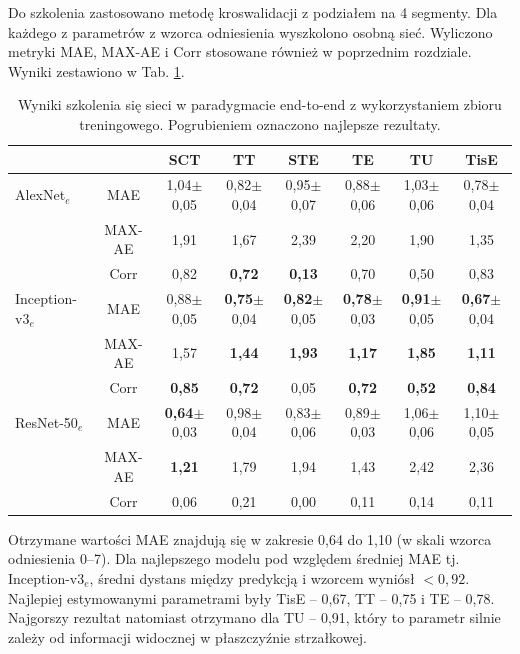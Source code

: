 Do szkolenia zastosowano metodę kroswalidacji z podziałem na 4 segmenty. Dla każdego z parametrów z wzorca odniesienia wyszkolono osobną sieć. Wyliczono metryki MAE, MAX-AE i Corr stosowane również w poprzednim rozdziale. Wyniki zestawiono w Tab. \ref{tab:end-to-endTrain}.
\renewcommand{\arraystretch}{1.2}
\begin{table}[ht]
\scriptsize
\setlength{\tabcolsep}{1pt}
\centering
\caption{Wyniki szkolenia się sieci w paradygmacie end-to-end z wykorzystaniem zbioru treningowego. Pogrubieniem oznaczono najlepsze rezultaty.}
\label{tab:end-to-endTrain}
\begin{tabular}{lc||c|c|c|c|c|c}
	&& \textbf{SCT} & \textbf{TT} & \textbf{STE} & \textbf{TE} & \textbf{TU} & \textbf{TisE}\\ \hline \hline
	AlexNet$_{e}$ & MAE & 1,04$\pm$0,05 & 0,82$\pm$0,04 & 0,95$\pm$0,07 & 0,88$\pm$0,06 & 1,03$\pm$0,06 & 0,78$\pm$0,04  \\
	&MAX-AE & 1,91 & 1,67 & 2,39 & 2,20 & 1,90 & 1,35\\ 
	&Corr & 0,82 & \textbf{0,72} & \textbf{0,13} & 0,70 & 0,50 & 0,83 \\ \hline
	Inception-v3$_{e}$ & MAE & 0,88$\pm$0,05 & \textbf{0,75}$\pm$0,04 & \textbf{0,82}$\pm$0,05 & \textbf{0,78}$\pm$0,03 & \textbf{0,91}$\pm$0,05 & \textbf{0,67}$\pm$0,04 \\
	&MAX-AE & 1,57 & \textbf{1,44} & \textbf{1,93} & \textbf{1,17} & \textbf{1,85} & \textbf{1,11} \\ 
	&Corr & \textbf{0,85} & \textbf{0,72} & 0,05 & \textbf{0,72} & \textbf{0,52} & \textbf{0,84} \\ \hline
	ResNet-50$_{e}$ & MAE & \textbf{0,64}$\pm$0,03 & 0,98$\pm$0,04 & 0,83$\pm$0,06 & 0,89$\pm$0,03 & 1,06$\pm$0,06 & 1,10$\pm$0,05  \\
	&MAX-AE & \textbf{1,21} & 1,79 & 1,94 & 1,43 & 2,42 & 2,36\\
	&Corr & 0,06 & 0,21 & 0,00 & 0,11 & 0,14 & 0,11\\
	
	
\end{tabular}
\end{table}
\renewcommand{\arraystretch}{1}

Otrzymane wartości MAE znajdują się w zakresie 0,64 do 1,10 (w skali wzorca odniesienia 0--7). Dla najlepszego modelu pod względem średniej MAE tj. Inception-v3$_{e}$, średni dystans między predykcją i wzorcem wyniósł $<0,92$. Najlepiej estymowanymi parametrami były TisE -- 0,67, TT -- 0,75 i TE -- 0,78. Najgorszy rezultat natomiast otrzymano dla TU -- 0,91, który to parametr silnie zależy od informacji widocznej w płaszczyźnie strzałkowej.


